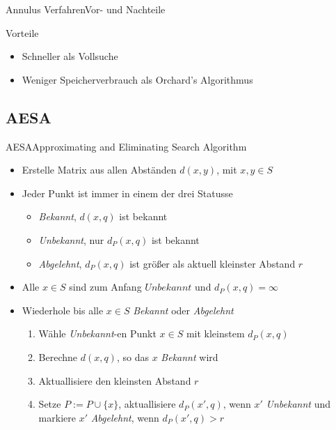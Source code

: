 \documentclass{beamer}
\begin{document}
\begin{frame}{Annulus Verfahren}{Vor- und Nachteile}
 \begin{block}{Vorteile}
  \begin{itemize}
   \item Schneller als Vollsuche
   \item Weniger Speicherverbrauch als Orchard’s Algorithmus
  \end{itemize}
 \end{block}
\end{frame}

\subsection{AESA}
\begin{frame}{AESA}{Approximating and Eliminating Search Algorithm}
 \begin{itemize}
  \item Erstelle Matrix aus allen Abständen $d(x, y)$, mit $x, y \in S$
  \pause
  \item Jeder Punkt ist immer in einem der drei Statusse
  \begin{itemize}
   \item \textit{Bekannt}, $d(x, q)$ ist bekannt
   \pause
   \item \textit{Unbekannt}, nur $d_P(x, q)$ ist bekannt
   \pause
   \item \textit{Abgelehnt}, $d_P(x, q)$ ist größer als aktuell kleinster Abstand $r$
  \end{itemize}
  \pause
  \item Alle $x \in S$ sind zum Anfang $Unbekannt$ und $d_P(x, q) = \infty$
  \pause
  \item Wiederhole bis alle $x \in S$ \textit{Bekannt} oder \textit{Abgelehnt}
  \begin{enumerate}
   \item Wähle \textit{Unbekannt}-en Punkt $x \in S$ mit kleinstem $d_P(x, q)$
   \pause
   \item Berechne $d(x,q)$, so das $x$ \textit{Bekannt} wird
   \pause
   \item Aktuallisiere den kleinsten Abstand $r$
   \pause
   \item Setze $P:= P \cup \{x\}$, aktuallisiere $d_P(x', q)$, wenn $x'$ \textit{Unbekannt} und markiere $x'$ \textit{Abgelehnt}, wenn $d_P(x', q) > r$
  \end{enumerate}
 \end{itemize}
\end{frame}
\end{document}
